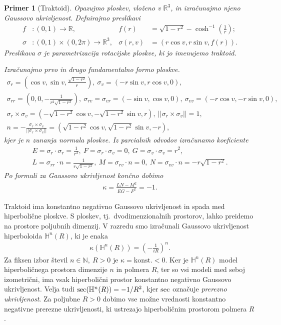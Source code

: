 \documentclass[a4paper]{article}
\newtheorem{primer}{Primer}
\begin{document}
\begin{primer}[Traktoid]
Opazujmo ploskev, vloženo v $\mathbb{R}^{3}$, in izračunajmo njeno Gaussovo ukrivljenost.
Defnirajmo preslikavi
\begin{align*}
f &\colon (0,1) \to \mathbb{R}, &f(r) &= \sqrt{1-r^2} - \cosh ^{-1} \left(\frac{1}{r} \right); \\
\sigma &\colon (0,1) \times (0,2\pi) \to \mathbb{R}^{3}, &\sigma(r,v) &= (r \cos{v}, r \sin{v}, f(r)).
\end{align*}
Preslikava $\sigma$ je parametrizacija rotacijske ploskve, ki jo imenujemo \emph{traktoid}.

Izračunajmo prvo in drugo fundamentalno formo ploskve.
\begin{gather*}
\sigma_{r} = \left(\cos{v}, \sin{v}, \frac{\sqrt{1-r^2}}{r} \right), \  \sigma_{v} = \left(-r \sin{v}, r \cos{v}, 0 \right), \\
\sigma_{rr} = \left(0, 0, -\frac{1}{r^2 \sqrt{1-r^2}} \right), \  \sigma_{rv} = \sigma_{vr} = (-\sin{v}, \cos{v}, 0), \  \sigma_{vv} = (-r\cos{v}, -r\sin{v}, 0), \\
\sigma_{r} \times \sigma_{v} = \left(-\sqrt{1-r^2}\cos{v}, -\sqrt{1-r^2}\sin{v}, r \right), \  ||\sigma_{r} \times \sigma_{v}|| = 1, \\
n = -\frac{\sigma_{r} \times \sigma_{v}}{||\sigma_{r} \times \sigma_{v}||} = \left(\sqrt{1-r^2}\cos{v}, \sqrt{1-r^2}\sin{v}, -r \right),
\end{gather*}
kjer je $n$ zunanja normala ploskve. Iz parcialnih odvodov izračunamo koeficiente
\begin{gather*}
E = \sigma_{r} \cdot \sigma_{r} = \frac{1}{r^2}, \ F = \sigma_{r} \cdot \sigma_{v} = 0, \ G = \sigma_{v} \cdot \sigma_{v} = r^2, \\
L = \sigma_{rr} \cdot n = \frac{1}{r\sqrt{1-r^2}}, \ M = \sigma_{rv} \cdot n = 0, \ N = \sigma_{vv} \cdot n = -r\sqrt{1-r^2}.
\end{gather*}
Po formuli za Gaussovo ukrivljenost končno dobimo
\begin{gather*}
\kappa = \frac{LN-M^2}{EG-F^2} = -1.
\end{gather*}
\end{primer}

Traktoid ima konstantno negativno Gaussovo ukrivljenost in spada med hiperbolične ploskve. S ploskev, tj.~dvodimenzionalnih prostorov, lahko preidemo na prostore poljubnih dimenzij. V razredu smo izračunali Gaussovo ukrivljenost hiperboloida $\mathbb{H}^{n}(R)$, ki je enaka 
\begin{gather}
\kappa (\mathbb{H}^{n}(R)) = \left(-\frac{1}{iR} \right)^n.
\end{gather}
 Za fiksen izbor števil $n \in \mathbb{N}, \ R>0$ je $\kappa = \mbox{konst.}<0$. Ker je $\mathbb{H}^{n}(R)$ model hiperboličnega prostora dimenzije $n$ in polmera $R$, ter so vsi modeli med seboj izometrični, ima vsak hiperbolični prostor konstantno negativno Gaussovo ukrivljenost. Velja tudi $\textup{sec}(\mathbb{H}^{n}(R)) = -1/R^2$, kjer $\textup{sec}$ označuje \emph{prerezno ukrivljenost}. Za poljubne $R>0$ dobimo vse možne vrednosti konstantno negativne prerezne ukrivljenosti, ki ustrezajo hiperboličnim prostorom polmera $R$.
\end{document}
